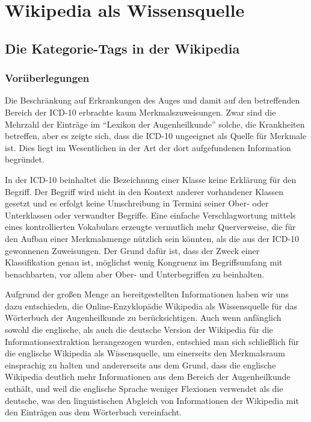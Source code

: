 \documentclass[pagesize,paper=A4,DIV=calc,fontsize=12pt,draft=false]{scrreprt}
\begin{document}
\section{Wikipedia als Wissensquelle}

\subsection{Die Kategorie-Tags in der Wikipedia}
\label{subsec:wiki_cats}

\subsubsection{Vorüberlegungen}

Die Beschränkung auf Erkrankungen des Auges und damit auf den betreffenden Bereich der ICD-10 erbrachte kaum Merkmalszuweisungen.
Zwar sind die Mehrzahl der Einträge im \enquote{Lexikon der Augenheilkunde} solche, die Krankheiten betreffen, aber es zeigte sich, dass die ICD-10 ungeeignet als Quelle für Merkmale ist. 
Dies liegt im Wesentlichen in der Art der dort aufgefundenen Information begründet. 

In der ICD-10 beinhaltet die Bezeichnung einer Klasse keine Erklärung für den Begriff. 
Der Begriff wird nicht in den Kontext anderer vorhandener Klassen gesetzt und es erfolgt keine Umschreibung in Termini seiner Ober- oder Unterklassen oder verwandter Begriffe. 
Eine einfache Verschlagwortung mittels eines kontrollierten Vokabulars erzeugte vermutlich mehr Querverweise, die für den Aufbau einer Merkmalsmenge nützlich sein könnten, als die aus der ICD-10 gewonnenen Zuweisungen. 
Der Grund dafür ist, dass der Zweck einer Klassifikation genau ist, möglichst wenig Kongruenz im Begriffsumfang mit benachbarten, vor allem aber Ober- und Unterbegriffen zu beinhalten. 

Aufgrund der großen Menge an bereitgestellten Informationen haben wir uns dazu entschieden, die Online-Enzyklopädie Wikipedia als Wissensquelle für das Wörterbuch der Augenheilkunde zu berücksichtigen. 
Auch wenn anfänglich sowohl die englische, als auch die deutsche Version der Wikipedia für die Informationsextraktion herangezogen wurden, entschied man sich schließlich für die englische Wikipedia als Wissensquelle, um einerseits den Merkmalsraum einsprachig zu halten und andererseits aus dem Grund, dass die englische Wikipedia deutlich mehr Informationen aus dem Bereich der Augenheilkunde enthält, und weil die englische Sprache weniger Flexionen verwendet als die deutsche, was den linguistischen Abgleich von Informationen der Wikipedia mit den Einträgen aus dem Wörterbuch vereinfacht. 
\end{document}
